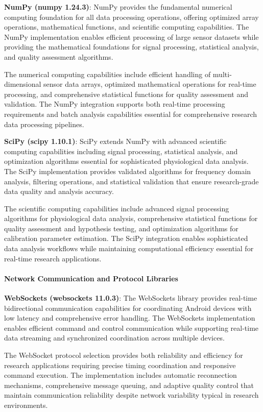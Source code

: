 \documentclass[12pt,a4paper]{article}
\begin{document}
\textbf{NumPy (numpy 1.24.3)}: NumPy provides the fundamental numerical computing foundation for all data processing
operations, offering optimized array operations, mathematical functions, and scientific computing capabilities. The
NumPy implementation enables efficient processing of large sensor datasets while providing the mathematical foundations
for signal processing, statistical analysis, and quality assessment algorithms.

The numerical computing capabilities include efficient handling of multi-dimensional sensor data arrays, optimized
mathematical operations for real-time processing, and comprehensive statistical functions for quality assessment and
validation. The NumPy integration supports both real-time processing requirements and batch analysis capabilities
essential for comprehensive research data processing pipelines.

\textbf{SciPy (scipy 1.10.1)}: SciPy extends NumPy with advanced scientific computing capabilities including signal
processing, statistical analysis, and optimization algorithms essential for sophisticated physiological data analysis.
The SciPy implementation provides validated algorithms for frequency domain analysis, filtering operations, and
statistical validation that ensure research-grade data quality and analysis accuracy.

The scientific computing capabilities include advanced signal processing algorithms for physiological data analysis,
comprehensive statistical functions for quality assessment and hypothesis testing, and optimization algorithms for
calibration parameter estimation. The SciPy integration enables sophisticated data analysis workflows while maintaining
computational efficiency essential for real-time research applications.

\paragraph{Network Communication and Protocol Libraries}

\textbf{WebSockets (websockets 11.0.3)}: The WebSockets library provides real-time bidirectional communication capabilities
for coordinating Android devices with low latency and comprehensive error handling. The WebSockets implementation
enables efficient command and control communication while supporting real-time data streaming and synchronized
coordination across multiple devices.

The WebSocket protocol selection provides both reliability and efficiency for research applications requiring precise
timing coordination and responsive command execution. The implementation includes automatic reconnection mechanisms,
comprehensive message queuing, and adaptive quality control that maintain communication reliability despite network
variability typical in research environments.
\end{document}
